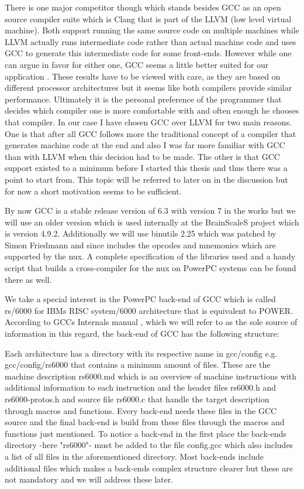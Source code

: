 There is one major competitor though which stands besides GCC as an open source compiler suite which is Clang that is part of the LLVM (low level virtual machine).
Both support running the same source code on multiple machines while LLVM actually runs intermediate code rather than actual machine code and uses GCC to generate this intermediate code for some front-ends.
However while one can argue in favor for either one, GCC seems a little better suited for our application .
These results have to be viewed with care, as they are based on different processor architectures but it seems like both compilers provide similar performance.
Ultimately it is the personal preference of the programmer that decides which compiler one is more comfortable with and often enough he chooses that compiler.
In our case I have chosen GCC over LLVM for two main reasons.
One is that after all GCC follows more the traditional concept of a compiler that generates machine code at the end and also I was far more familiar with GCC than with LLVM when this decision had to be made.
The other is that GCC support existed to a minimum before I started this thesis and thus there was a point to start from.
This topic will be referred to later on in the discussion but for now a short motivation seems to be sufficient.

By now GCC is a stable release version of 6.3 with version 7 in the works but we will use an older version which is used internally at the BrainScaleS project which is version 4.9.2.
Additionally we will use binutils 2.25 which was patched by Simon Friedmann and since includes the opcodes and mnemonics which are supported by the nux.
A complete specification of the libraries used and a handy script that builds a cross-compiler for the nux on PowerPC systems can be found there as well.

We take a special interest in the PowerPC back-end of GCC which is called rs/6000 for IBMs RISC system/6000 architecture that is equivalent to POWER.
According to GCCs Internals manual , which we will refer to as the sole source of information in this regard, the back-end of GCC has the following structure:

Each architecture has a directory with its respective name in gcc/config e.g. gcc/config/rs6000 that contains a minimum amount of files.
These are the machine description rs6000.md which is an overview of machine instructions with additional information to each instruction and the header files rs6000.h and rs6000-protos.h and source file rs6000.c that handle the target description through macros and functions.
Every back-end needs these files in the GCC source and the final back-end is build from these files through the macros and functions just mentioned.
To notice a back-end in the first place the back-ends directory -here "rs6000"- must be added to the file config.gcc which also includes a list of all files in the aforementioned directory.
Most back-ends include additional files which makes a back-ends complex structure clearer but these are not mandatory and we will address these later.

